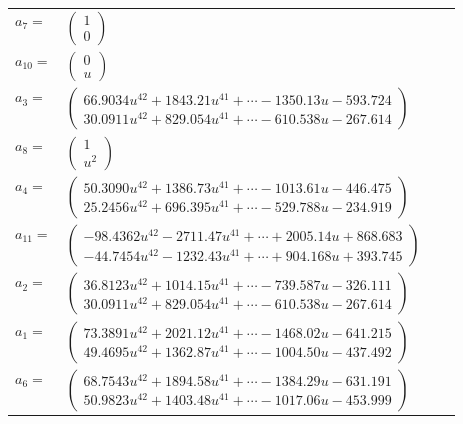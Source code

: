 \documentclass[1p]{elsarticle_modified}
\theoremstyle{definition}
\begin{document}
\begin{tabular}{m{7pt} m{180pt} m{7pt} m{180pt} }
\flushright $a_{7}=$&$\begin{pmatrix}1\\0\end{pmatrix}$ \\
\flushright $a_{10}=$&$\begin{pmatrix}0\\u\end{pmatrix}$ \\
\flushright $a_{3}=$&$\begin{pmatrix}66.9034 u^{42}+1843.21 u^{41}+\cdots-1350.13 u-593.724\\30.0911 u^{42}+829.054 u^{41}+\cdots-610.538 u-267.614\end{pmatrix}$ \\
\flushright $a_{8}=$&$\begin{pmatrix}1\\u^2\end{pmatrix}$ \\
\flushright $a_{4}=$&$\begin{pmatrix}50.3090 u^{42}+1386.73 u^{41}+\cdots-1013.61 u-446.475\\25.2456 u^{42}+696.395 u^{41}+\cdots-529.788 u-234.919\end{pmatrix}$ \\
\flushright $a_{11}=$&$\begin{pmatrix}-98.4362 u^{42}-2711.47 u^{41}+\cdots+2005.14 u+868.683\\-44.7454 u^{42}-1232.43 u^{41}+\cdots+904.168 u+393.745\end{pmatrix}$ \\
\flushright $a_{2}=$&$\begin{pmatrix}36.8123 u^{42}+1014.15 u^{41}+\cdots-739.587 u-326.111\\30.0911 u^{42}+829.054 u^{41}+\cdots-610.538 u-267.614\end{pmatrix}$ \\
\flushright $a_{1}=$&$\begin{pmatrix}73.3891 u^{42}+2021.12 u^{41}+\cdots-1468.02 u-641.215\\49.4695 u^{42}+1362.87 u^{41}+\cdots-1004.50 u-437.492\end{pmatrix}$ \\
\flushright $a_{6}=$&$\begin{pmatrix}68.7543 u^{42}+1894.58 u^{41}+\cdots-1384.29 u-631.191\\50.9823 u^{42}+1403.48 u^{41}+\cdots-1017.06 u-453.999\end{pmatrix}$ \\

\end{tabular}
\end{document}
